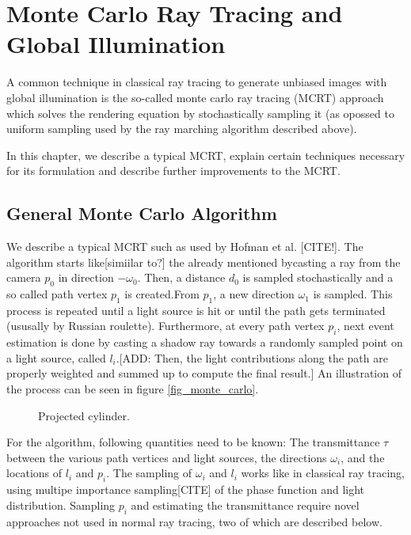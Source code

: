 \section{Monte Carlo Ray Tracing and Global Illumination}
A common technique in classical ray tracing to generate unbiased images with global illumination is the so-called monte carlo ray tracing (MCRT) approach which solves the rendering equation by stochastically sampling it (as opossed to uniform sampling used by the ray marching algorithm described above).

In this chapter, we describe a typical MCRT, explain certain techniques necessary for its formulation and describe further improvements to the MCRT. 
\subsection{General Monte Carlo Algorithm}
We describe a typical MCRT such as used by Hofman et al. [CITE!].
The algorithm starts like[simiilar to?] the already mentioned bycasting a ray from the camera $p_0$ in direction $-\omega_0$. Then, a distance $d_0$ is sampled stochastically and a so called path vertex $p_1$ is created.From $p_1$, a new direction $\omega_1$ is sampled. This process is repeated until a light source is hit or until the path gets terminated (ususally by Russian roulette). Furthermore, at every path vertex $p_i$, next event estimation is done by casting a shadow ray towards a randomly sampled point on a light source, called $l_i$.[ADD: Then, the light contributions along the path are properly weighted and summed up to compute the final result.]
An illustration of the process can be seen in figure \ref{fig_monte_carlo}.
\begin{figure}
\centering
\def\svgwidth{\columnwidth}


  \caption{\label{fig:monte_carlo}
         Projected cylinder.}
\end{figure}
For the algorithm, following quantities need to be known: The transmittance $\tau$ between the various path vertices and light sources, the directions $\omega_i$, and the locations of $l_i$ and $p_i$.
The sampling of $\omega_i$ and $l_i$ works like in classical ray tracing, using multipe importance sampling[CITE] of the phase function and light distribution. Sampling $p_i$ and estimating the transmittance require novel approaches not used in normal ray tracing, two of which are described below. 
